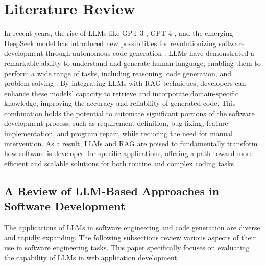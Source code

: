 \section{Literature Review}
\label{Literature Review}
In recent years, the rise of LLMs like GPT-3 \citep{brown2020language}, GPT-4 \citep{sun2023gpt}, and the emerging DeepSeek model has introduced new possibilities for revolutionizing software development through autonomous code generation \citep{guo2024deepseek}. LLMs have demonstrated a remarkable ability to understand and generate human language, enabling them to perform a wide range of tasks, including reasoning, code generation, and problem-solving \citep{li2023autonomous, tupayachi2024towards}. By integrating LLMs with RAG techniques, developers can enhance these models' capacity to retrieve and incorporate domain-specific knowledge, improving the accuracy and reliability of generated code. This combination holds the potential to automate significant portions of the software development process, such as requirement definition, bug fixing, feature implementation, and program repair, while reducing the need for manual intervention. As a result, LLMs and RAG are poised to fundamentally transform how software is developed for specific applications, offering a path toward more efficient and scalable solutions for both routine and complex coding tasks \citep{meyer2023llm, baldazzi2023fine}.

\subsection{A Review of LLM-Based Approaches in Software Development}
The applications of LLMs in software engineering and code generation are diverse and rapidly expanding. The following subsections review various aspects of their use in software engineering tasks. This paper specifically focuses on evaluating the capability of LLMs in web application development.

